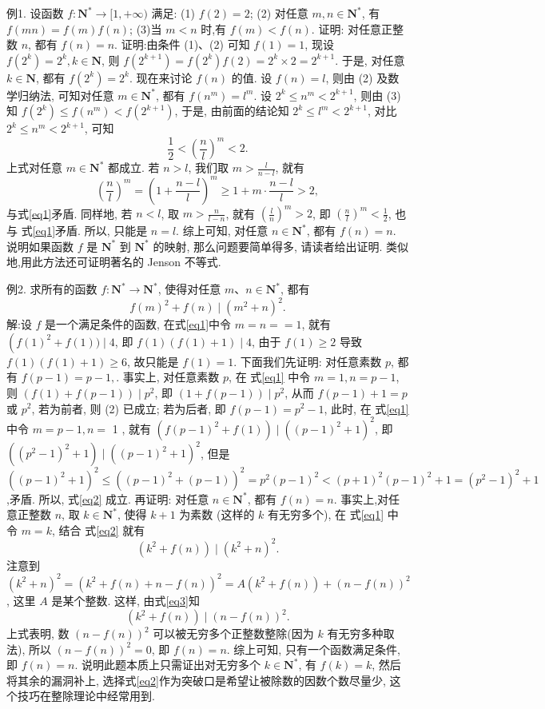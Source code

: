 例1. 设函数 $f: \mathbf{N}^* \rightarrow[1,+\infty)$ 满足:
(1) $f(2)=2$;
(2) 对任意 $m, n \in \mathbf{N}^*$, 有 $f(m n)=f(m) f(n)$;
(3)当 $m<n$ 时,有 $f(m)<f(n)$.
证明: 对任意正整数 $n$, 都有 $f(n)=n$.
证明:由条件 (1)、(2) 可知 $f(1)=1$, 现设 $f\left(2^k\right)=2^k, k \in \mathbf{N}$, 则 $f\left(2^{k+1}\right)=f\left(2^k\right) f(2)=2^k \times 2=2^{k+1}$. 于是, 对任意 $k \in \mathbf{N}$, 都有 $f\left(2^k\right)=2^k$.
现在来讨论 $f(n)$ 的值.
设 $f(n)=l$, 则由 (2) 及数学归纳法, 可知对任意 $m \in \mathbf{N}^*$, 都有 $f\left(n^m\right)=l^m$.
设 $2^k \leqslant n^m<2^{k+1}$, 则由 (3) 知 $f\left(2^k\right) \leqslant f\left(n^m\right)<f\left(2^{k+1}\right)$, 于是, 由前面的结论知 $2^k \leqslant l^m<2^{k+1}$, 对比 $2^k \leqslant n^m<2^{k+1}$, 可知
$$
\frac{1}{2}<\left(\frac{n}{l}\right)^m<2 . \label{eq1}
$$
上式对任意 $m \in \mathbf{N}^*$ 都成立.
若 $n>l$, 我们取 $m>\frac{l}{n-l}$, 就有
$$
\left(\frac{n}{l}\right)^m=\left(1+\frac{n-l}{l}\right)^m \geqslant 1+m \cdot \frac{n-l}{l}>2,
$$
与式\ref{eq1}矛盾.
同样地, 若 $n<l$, 取 $m>\frac{n}{l-n}$, 就有 $\left(\frac{l}{n}\right)^m>2$, 即 $\left(\frac{n}{l}\right)^m<\frac{1}{2}$, 也与 式\ref{eq1}矛盾.
所以, 只能是 $n=l$.
综上可知, 对任意 $n \in \mathbf{N}^*$, 都有 $f(n)=n$.
说明如果函数 $f$ 是 $\mathbf{N}^*$ 到 $\mathbf{N}^*$ 的映射, 那么问题要简单得多, 请读者给出证明.
类似地,用此方法还可证明著名的 Jenson 不等式.



例2. 求所有的函数 $f: \mathbf{N}^* \rightarrow \mathbf{N}^*$, 使得对任意 $m 、 n \in \mathbf{N}^*$, 都有
$$
f(m)^2+f(n) \mid\left(m^2+n\right)^2 . \label{eq1}
$$
解:设 $f$ 是一个满足条件的函数, 在式\ref{eq1}中令 $m=n==1$, 就有 $\left(f(1)^2+\right. f(1)) \mid 4$, 即 $f(1)(f(1)+1) \mid 4$, 由于 $f(1) \geqslant 2$ 导致 $f(1)(f(1)+1) \geqslant 6$, 故只能是 $f(1)=1$.
下面我们先证明: 对任意素数 $p$, 都有 $f(p-1)=p-1, \label{eq2}$.
事实上, 对任意素数 $p$, 在 式\ref{eq1} 中令 $m=1, n=p-1$, 则 $(f(1)+ f(p-1)) \mid p^2$, 即 $(1+f(p-1)) \mid p^2$, 从而 $f(p-1)+1=p$ 或 $p^2$, 若为前者, 则 (2) 已成立; 若为后者, 即 $f(p-1)=p^2-1$, 此时, 在 式\ref{eq1} 中令 $m=p-1, n=$ 1 , 就有 $\left(f(p-1)^2+f(1)\right) \mid\left((p-1)^2+1\right)^2$, 即 $\left(\left(p^2-1\right)^2+1\right) \mid\left((p-1)^2+1\right)^2$, 但是 $\left((p-1)^2+1\right)^2 \leqslant\left((p-1)^2+(p-1)\right)^2=p^2(p-1)^2<(p+1)^2(p- 1)^2+1=\left(p^2-1\right)^2+1$,矛盾.
所以, 式\ref{eq2} 成立.
再证明: 对任意 $n \in \mathbf{N}^*$, 都有 $f(n)=n$.
事实上,对任意正整数 $n$, 取 $k \in \mathbf{N}^*$, 使得 $k+1$ 为素数 (这样的 $k$ 有无穷多个), 在 式\ref{eq1} 中令 $m=k$, 结合 式\ref{eq2} 就有
$$
\left(k^2+f(n)\right) \mid\left(k^2+n\right)^2 . \label{eq3}
$$
注意到 $\left(k^2+n\right)^2=\left(k^2+f(n)+n-f(n)\right)^2=A\left(k^2+f(n)\right)+(n-f(n))^2$, 这里 $A$ 是某个整数.
这样, 由式\ref{eq3}知
$$
\left(k^2+f(n)\right) \mid(n-f(n))^2 .
$$
上式表明, 数 $(n-f(n))^2$ 可以被无穷多个正整数整除(因为 $k$ 有无穷多种取法), 所以 $(n-f(n))^2=0$, 即 $f(n)=n$.
综上可知, 只有一个函数满足条件, 即 $f(n)=n$.
说明此题本质上只需证出对无穷多个 $k \in \mathbf{N}^*$, 有 $f(k)=k$, 然后将其余的漏洞补上, 选择式\ref{eq2}作为突破口是希望让被除数的因数个数尽量少, 这个技巧在整除理论中经常用到.



